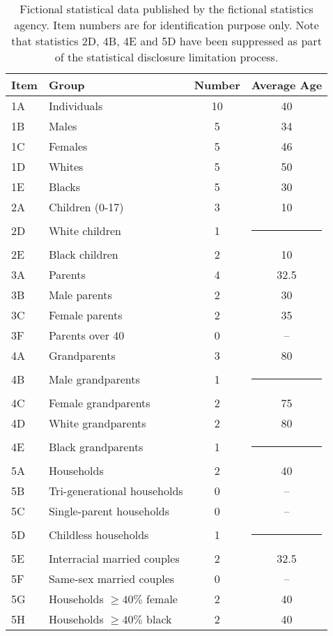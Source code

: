 \documentclass[runningheads]{llncs}
\begin{document}
\begin{table}
\begin{center}
\begin{tabular}{l|l|c|c}
Item & Group & Number & Average Age \\
\hline
1A & Individuals & 10 & 40 \\
1B & Males & 5 & 34 \\
1C & Females & 5 & 46 \\
1D & Whites & 5 & 50 \\
1E & Blacks & 5 & 30 \\
\hline
2A & Children (0-17) & 3 & 10 \\
2D & White children  & 1 & \multicolumn{1}{c}{\rule{6mm}{3mm}} \\
2E & Black children  & 2 & 10 \\
\hline
3A & Parents & 4 & 32.5 \\
3B & Male parents & 2 & 30 \\
3C & Female parents & 2 & 35 \\
3F & Parents over 40 & 0 & -- \\
\hline
4A & Grandparents & 3 & 80 \\
4B & Male grandparents & 1 & \multicolumn{1}{c}{\rule{6mm}{3mm}} \\
4C & Female grandparents & 2 & 75 \\
4D & White grandparents & 2 & 80 \\
4E & Black grandparents & 1 & \multicolumn{1}{c}{\rule{6mm}{3mm}} \\
\hline
5A & Households & 2 & 40 \\
5B & Tri-generational households & 0 & -- \\
5C & Single-parent households & 0 & -- \\
5D & Childless households & 1 & \multicolumn{1}{c}{\rule{6mm}{3mm}} \\
5E & Interracial married couples & 2 & 32.5 \\
5F & Same-sex married couples & 0 & -- \\
5G & Households $\geq 40\% $ female & 2 & 40 \\
5H & Households $\geq 40\% $ black & 2 & 40 \\
\hline
\end{tabular}
\end{center}
\caption{Fictional statistical data published by the fictional
  statistics agency. Item numbers are for identification purpose
  only. Note that statistics 2D, 4B, 4E and 5D have been suppressed as part
  of the statistical disclosure limitation process.}\label{publishedstatsbig}
\end{table}
\end{document}
